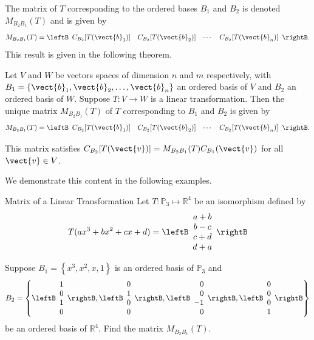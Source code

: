The matrix of $T$ corresponding to the ordered
bases $B_1$ and $B_2$ is denoted $ M_{B_2B_1}(T)$ and is given by 
\[ M_{B_2B_1}(T)=
\leftB\begin{array}{cccc}
C_{B_2} [ T(\vect{b}_1)] & C_{B_2}[T(\vect{b}_2) ] &
\cdots & C_{B_2}[T(\vect{b}_n) ] \end{array}\rightB.\] 
This result is given in the following theorem. 

\begin{theorem}{}
Let $V$ and $W$ be vectors spaces of dimension
$n$ and $m$ respectively, with $B_1=\{\vect{b}_1, \vect{b}_2, \ldots, \vect{b}_n\}$ an
ordered basis of $V$ and $B_2$ an ordered basis of $W$. Suppose $T:V\to W$ is a linear transformation. Then the unique matrix $M_{B_2B_1}(T)$ of $T$ corresponding to $B_1$ and $B_2$ is given by 
\[ M_{B_2B_1}(T)=
\leftB\begin{array}{cccc}
C_{B_2}[T(\vect{b}_1)] & C_{B_2}[T(\vect{b}_2)] &
\cdots & C_{B_2}[T(\vect{b}_n)] \end{array}\rightB.\]

This matrix satisfies  $C_{B_2}[T(\vect{v})]=M_{B_2B_1}(T)C_{B_1}(\vect{v})$ for all $\vect{v}\in V$.
\end{theorem}

We demonstrate this content in the following examples. 

\begin{example}{Matrix of a Linear Transformation}\label{exa:matrixoflineartransformation}
Let $T: \mathbb{P}_3 \mapsto \mathbb{R}^4$ be an isomorphism defined by
\[
T( ax^3 + bx^2 + cx + d) = \leftB \begin{array}{c}
a + b \\
b - c \\
c + d \\
d + a 
\end{array} \rightB
\]

Suppose $B_1 = \left\{ x^3, x^2, x, 1 \right\}$ is an ordered basis of $\mathbb{P}_3$ and 
\[
B_2 = \left\{ \leftB \begin{array}{r}
1 \\
0 \\
1 \\
0
\end{array} \rightB, \leftB \begin{array}{r}
0 \\
1 \\
0 \\
0
\end{array} \rightB, 
\leftB \begin{array}{r}
0 \\
0 \\
-1 \\
0
\end{array} \rightB, 
\leftB \begin{array}{r}
0 \\
0 \\
0 \\
1
\end{array} \rightB \right\} 
\]
be an ordered basis of $\mathbb{R}^4$.
Find the matrix $M_{B_2B_1}(T)$. 
\end{example}

